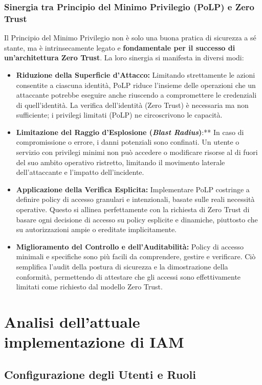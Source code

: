 \subsubsection{Sinergia tra Principio del Minimo Privilegio (PoLP) e Zero Trust}
\label{subsubsec:polp-zerotrust-correlation}

Il Principio del Minimo Privilegio non è solo una buona pratica di sicurezza a sé stante, ma è intrinsecamente legato e \textbf{fondamentale per il successo di un'architettura Zero Trust}. La loro sinergia si manifesta in diversi modi:

\begin{itemize}
    \item \textbf{Riduzione della Superficie d'Attacco:} Limitando strettamente le azioni consentite a ciascuna identità, PoLP riduce l'insieme delle operazioni che un attaccante potrebbe eseguire anche riuscendo a compromettere le credenziali di quell'identità. La verifica dell'identità (Zero Trust) è necessaria ma non sufficiente; i privilegi limitati (PoLP) ne circoscrivono le capacità.
    \item \textbf{Limitazione del Raggio d'Esplosione (\textit{Blast Radius})}:** In caso di compromissione o errore, i danni potenziali sono confinati. Un utente o servizio con privilegi minimi non può accedere o modificare risorse al di fuori del suo ambito operativo ristretto, limitando il movimento laterale dell'attaccante e l'impatto dell'incidente.
    \item \textbf{Applicazione della Verifica Esplicita:} Implementare PoLP costringe a definire policy di accesso granulari e intenzionali, basate sulle reali necessità operative. Questo si allinea perfettamente con la richiesta di Zero Trust di basare ogni decisione di accesso su policy esplicite e dinamiche, piuttosto che su autorizzazioni ampie o ereditate implicitamente.
    \item \textbf{Miglioramento del Controllo e dell'Auditabilità:} Policy di accesso minimali e specifiche sono più facili da comprendere, gestire e verificare. Ciò semplifica l'audit della postura di sicurezza e la dimostrazione della conformità, permettendo di attestare che gli accessi sono effettivamente limitati come richiesto dal modello Zero Trust.
\end{itemize}
\section{Analisi dell'attuale implementazione di IAM}
\subsection{Configurazione degli Utenti e Ruoli}

